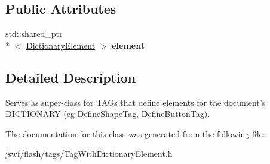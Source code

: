 \subsection*{Public Attributes}
\begin{DoxyCompactItemize}
\item 
\hypertarget{classjswf_1_1flash_1_1tags_1_1_tag_with_dictionary_element_adf8cedfeadf8e7cb71fa0d792fd43701}{std\+::shared\+\_\+ptr\\*
$<$ \hyperlink{classjswf_1_1flash_1_1_dictionary_element}{Dictionary\+Element} $>$ {\bfseries element}}\label{classjswf_1_1flash_1_1tags_1_1_tag_with_dictionary_element_adf8cedfeadf8e7cb71fa0d792fd43701}

\end{DoxyCompactItemize}


\subsection{Detailed Description}
Serves as super-\/class for {\ttfamily T\+A\+G}s that define elements for the document's {\ttfamily D\+I\+C\+T\+I\+O\+N\+A\+R\+Y} (eg \hyperlink{classjswf_1_1flash_1_1tags_1_1_define_shape_tag}{Define\+Shape\+Tag}, \hyperlink{classjswf_1_1flash_1_1tags_1_1_define_button_tag}{Define\+Button\+Tag}). 

The documentation for this class was generated from the following file\+:\begin{DoxyCompactItemize}
\item 
jswf/flash/tags/Tag\+With\+Dictionary\+Element.\+h\end{DoxyCompactItemize}
